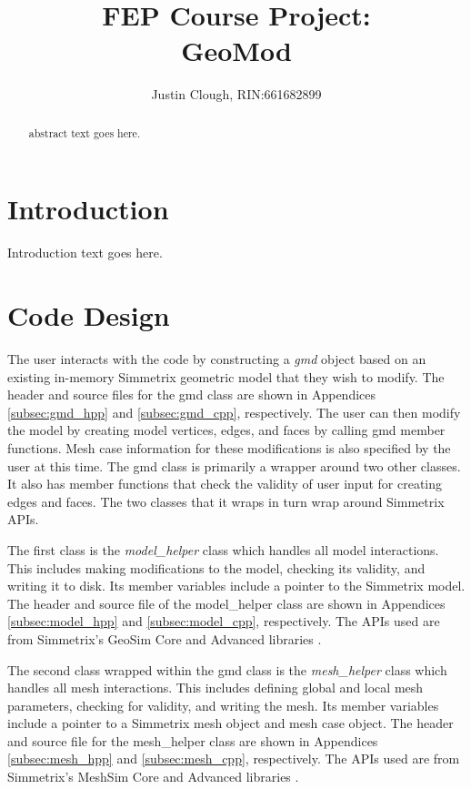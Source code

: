 \documentclass[a4paper, 12pt]{article}
\author{Justin Clough, RIN:661682899}
\title{FEP Course Project: \\
        GeoMod}
\begin{document}
\maketitle

\begin{abstract}
abstract text goes here.

\end{abstract}

\newpage
\section{Introduction} \label{sec:intro}
Introduction text goes here.

\section{Code Design} \label{sec:design}
The user interacts with the code by constructing a \emph{gmd}
object based on an existing in-memory Simmetrix geometric model that they 
wish to modify. The header and source files for the gmd class 
are shown in Appendices \ref{subsec:gmd_hpp} and \ref{subsec:gmd_cpp}, 
respectively.  The user can then modify the model by 
creating model vertices, edges, and faces by calling
gmd member functions. Mesh case information for these 
modifications is also specified by the user at this time.
The gmd class is primarily a wrapper around two other classes. It also
has member functions that check the validity of user input for creating 
edges and faces. The two classes that it wraps in turn wrap around Simmetrix APIs.

The first class is the \emph{model\_helper} class 
which handles all model interactions. This includes making modifications to
the model, checking its validity, and writing it to disk. Its member variables
include a pointer to the Simmetrix model. The header and source file of the 
model\_helper class are shown in Appendices \ref{subsec:model_hpp} and 
\ref{subsec:model_cpp}, respectively. The APIs used are from Simmetrix's 
GeoSim Core and Advanced libraries \cite{Simmetrix}. 

The second class wrapped within the gmd class is the
\emph{mesh\_helper} class which handles all mesh interactions. This includes
defining global and local mesh parameters, checking for validity, and writing the mesh. 
Its member variables include a pointer to a Simmetrix mesh object and mesh case object. 
The header and source file for the mesh\_helper class are shown in 
Appendices \ref{subsec:mesh_hpp} and \ref{subsec:mesh_cpp}, respectively.
The APIs used are from Simmetrix's MeshSim Core and Advanced libraries 
\cite{Simmetrix}.
\end{document}
